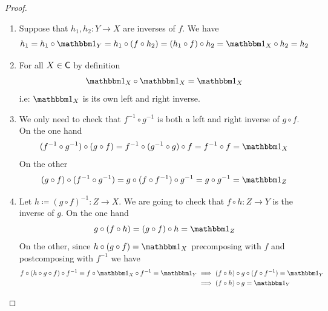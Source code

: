 \documentclass[../../main]{subfiles}
\begin{document}
\begin{proof}~
  \begin{enumerate}
    \item Suppose that \(h_{1}, h_{2}: Y \to X\) are inverses of \(f\).
          We have
          \begin{equation*}
            h_{1} = h_{1} \circ \id_{Y} = h_{1} \circ (f \circ h_{2}) = (h_{1} \circ f) \circ h_{2} = \id_{X} \circ h_{2} = h_{2}
          \end{equation*}
    \item For all \(X \in \mathsf{C}\) by definition
          \begin{equation*}
            \id_{X} \circ \id_{X} = \id_{X}
          \end{equation*}
          i.e: \(\id_{X}\) is its own left and right inverse.
    \item We only need to check that \(f^{-1} \circ g^{-1}\) is both a left and right inverse of \(g \circ f\).
          On the one hand
          \begin{equation*}
            (f^{-1} \circ g^{-1}) \circ (g \circ f) = f^{-1} \circ (g^{-1} \circ g) \circ f = f^{-1} \circ f = \id_{X}
          \end{equation*}
          On the other
          \begin{equation*}
            (g \circ f) \circ (f^{-1} \circ g^{-1}) = g \circ (f \circ f^{-1}) \circ g^{-1} = g \circ g^{-1} = \id_{Z}
          \end{equation*}
    \item Let \(h \coloneq (g \circ f)^{-1}: Z \to X\).
          We are going to check that \(f \circ h: Z \to Y\) is the inverse of \(g\).
          On the one hand
          \begin{equation*}
            g \circ (f \circ h) = (g \circ f) \circ h = \id_{Z}
          \end{equation*}
          On the other, since \(h \circ (g \circ f) = \id_{X}\) precomposing with \(f\) and postcomposing with \(f^{-1}\) we have
          \begin{align*}
            f \circ (h \circ g \circ f) \circ f^{-1} = f \circ \id_{X} \circ f^{-1} = \id_{Y} &\implies (f \circ h) \circ g \circ (f \circ f^{-1}) = \id_{Y} \\
                                                                      &\implies (f \circ h) \circ g = \id_{Y} \qedhere
          \end{align*}
  \end{enumerate}
\end{proof}
\end{document}
